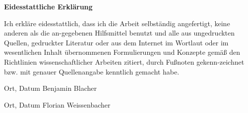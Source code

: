 \textbf{\Large Eidesstattliche Erklärung}

Ich erkläre eidesstattlich, dass ich die Arbeit selbständig angefertigt, keine anderen als die an-gegebenen Hilfsmittel benutzt und alle aus ungedruckten Quellen, gedruckter Literatur oder aus dem Internet im Wortlaut oder im wesentlichen Inhalt übernommenen Formulierungen und Konzepte gemäß den Richtlinien wissenschaftlicher Arbeiten zitiert, durch Fußnoten gekenn-zeichnet bzw. mit genauer Quellenangabe kenntlich gemacht habe.

\vspace{2cm}
\hspace{2cm}\hrulefill{}\hspace{2.35cm}\hrulefill{}\hspace{1cm}

\hspace{2cm} Ort, Datum \hspace{5cm} Benjamin Blacher \hfill

\vspace{2cm}
\hspace{2cm}\hrulefill{}\hspace{2.35cm}\hrulefill{}\hspace{1cm}

\hspace{2cm} Ort, Datum \hspace{5cm} Florian Weissenbacher \hfill